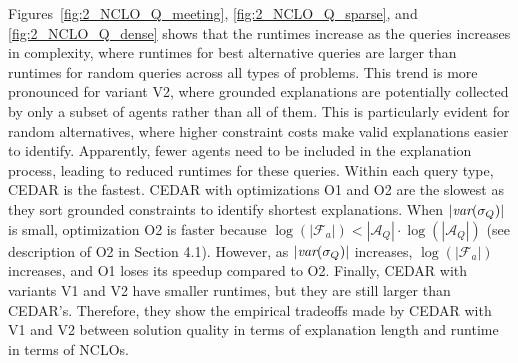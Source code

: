 \documentclass[twoside,11pt]{article}
\begin{document}
Figures~\ref{fig:2_NCLO_Q_meeting}, \ref{fig:2_NCLO_Q_sparse}, and \ref{fig:2_NCLO_Q_dense} shows that the runtimes increase as the queries increases in complexity, where runtimes for best alternative queries are larger than runtimes for random queries across all types of problems. This trend is more pronounced for variant V2, where grounded explanations are potentially collected by only a subset of agents rather than all of them. This is particularly evident for random alternatives, where higher constraint costs make valid explanations easier to identify. Apparently, fewer agents need to be included in the explanation process, leading to reduced runtimes for these queries. Within each query type, CEDAR is the fastest. CEDAR with optimizations O1 and O2 are the slowest as they sort grounded constraints to identify shortest explanations. When $|{\textit{var}(\sigma_Q)}|$ is small, optimization O2 is faster because $\log(|\mathcal{F}_a|) < |\mathcal{A}_Q| \cdot \log(|\mathcal{A}_Q|)$ (see description of O2 in Section 4.1). However, as $|{\textit{var}(\sigma_Q)}|$ increases, $\log(|\mathcal{F}_a|)$ increases, and O1 loses its speedup compared to O2. Finally, CEDAR with variants V1 and V2 have smaller runtimes, but they are still larger than CEDAR's. Therefore, they show the empirical tradeoffs made by CEDAR with V1 and V2 between solution quality in terms of explanation length and runtime in terms of NCLOs. 
\end{document}
